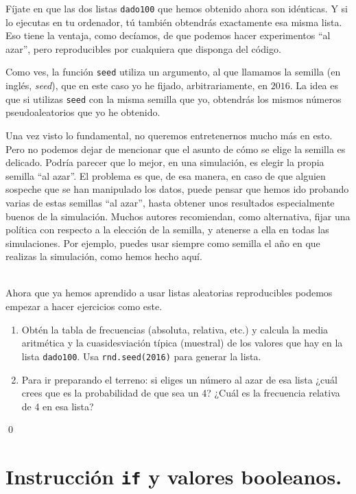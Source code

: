 \documentclass[10pt,a4paper]{article}\usepackage[]{graphicx}\usepackage[]{color}
\begin{document}
Fíjate en que las dos listas {\tt dado100} que hemos obtenido ahora son idénticas. Y si lo ejecutas en tu ordenador, tú también obtendrás exactamente esa misma lista. Eso tiene la ventaja, como decíamos, de que podemos hacer experimentos ``al azar'', pero reproducibles por cualquiera que disponga del código.

Como ves, la función {\tt seed} utiliza un argumento, al que llamamos la {\sf semilla} (en inglés, {\em seed}), que en este caso yo he fijado, arbitrariamente, en $2016$.  La idea es que si utilizas {\tt seed} con la misma semilla que yo, obtendrás los mismos números pseudoaleatorios que yo he obtenido.

Una vez visto lo fundamental, no queremos entretenernos mucho más en esto. Pero no podemos dejar de mencionar que el asunto de cómo se elige la semilla es delicado. Podría parecer que lo mejor, en una simulación, es elegir la propia semilla ``al azar''. El problema es que, de esa manera, en caso de que alguien sospeche que se han manipulado los datos, puede pensar que hemos ido probando varias de estas semillas ``al azar'', hasta obtener unos resultados especialmente buenos de la simulación. Muchos autores recomiendan, como alternativa, fijar una política con respecto a la elección de la semilla, y atenerse a ella en todas las simulaciones. Por ejemplo, puedes usar siempre como semilla el año en que realizas la simulación, como hemos hecho aquí.

\begin{ejercicio}
\label{tut02:ejercicio28}
\quad\\
Ahora que ya hemos aprendido a usar listas aleatorias reproducibles podemos empezar a hacer ejercicios como este.
\begin{enumerate}
\item Obtén la tabla de frecuencias  (absoluta, relativa, etc.) y calcula la media aritmética y la cuasidesviación típica (muestral) de los valores que hay en la lista {\tt dado100}. Usa {\tt rnd.seed(2016)} para generar la lista.
\item Para ir preparando el terreno: si eliges un número al azar de esa lista ¿cuál crees que es la probabilidad de que sea un 4? ¿Cuál es la frecuencia relativa de 4 en esa lista?
\end{enumerate}
\qed
\end{ejercicio}

\section{Instrucción {\tt if} y valores booleanos.}
\label{tut02:sec:instruccionIfValoresBooleanos}
\end{document}
